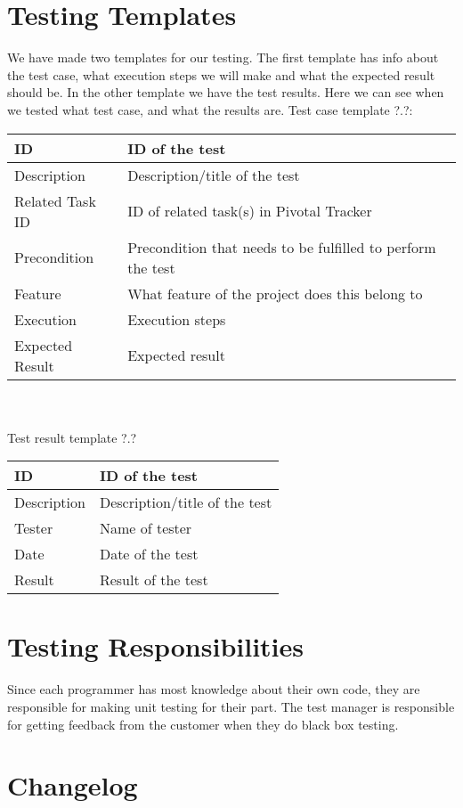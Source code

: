 \documentclass{report}
\begin{document}
\section{Testing Templates} \label{sec:testing_templates}
We have made two templates for our testing. The first template has info about the test case, what execution steps we will make and what the expected result should be. In the other template we have the test results. Here we can see when we tested what test case, and what the results are.
Test case template ?.?:\\
\begin{tabular}{| l | p{9 cm} |} \hline
ID & ID of the test \\ \hline
Description & Description/title of the test \\ \hline
Related Task ID & ID of related task(s) in Pivotal Tracker \\ \hline %
Precondition & Precondition that needs to be fulfilled to perform the test \\ \hline
Feature & What feature of the project does this belong to \\ \hline
Execution & Execution steps\\ \hline
Expected Result & Expected result\\ \hline
\end{tabular}\\\\
Test result template ?.?\\
\begin{tabular}{| l | l |} \hline
ID & ID of the test \\ \hline
Description & Description/title of the test \\ \hline
Tester & Name of tester \\ \hline
Date & Date of the test\\ \hline
Result & Result of the test\\ \hline
\end{tabular}

\section{Testing Responsibilities} \label{sec:testing_responsibilities}
Since each programmer has most knowledge about their own code, they are responsible for making unit testing for their part. The test manager is responsible for getting feedback from the customer when they do black box testing.

\section{Changelog} \label{sec:changelog}
\end{document}
